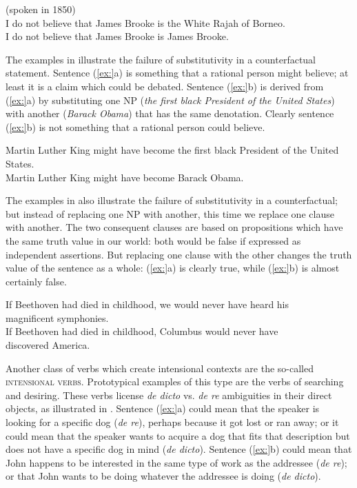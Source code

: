 \ea
(spoken in 1850)\\
\ea I do not believe that James Brooke is the White Rajah of Borneo.\\
\ex I do not believe that James Brooke is James Brooke.
                       \z
\z


The examples in  illustrate the failure of substitutivity in a counterfactual statement. Sentence (\ref{ex:}a) is something that a rational person might believe; at least it is a claim which could be debated. Sentence (\ref{ex:}b) is derived from (\ref{ex:}a) by substituting one NP (\textit{the first black President of the United States}) with another (\textit{Barack Obama}) that has the same denotation. Clearly sentence (\ref{ex:}b) is not something that a rational person could believe.


\ea
\ea Martin Luther King might have become the first black President of the United States.\\
\ex Martin Luther King might have become Barack Obama.
                       \z
\z


The examples in  also illustrate the failure of substitutivity in a counterfactual; but instead of replacing one NP with another, this time we replace one clause with another. The two consequent clauses are based on propositions which have the same truth value in our world: both would be false if expressed as independent assertions. But replacing one clause with the other changes the truth value of the sentence as a whole: (\ref{ex:}a) is clearly true, while (\ref{ex:}b) is almost certainly false.


\ea
\ea If Beethoven had died in childhood, we would never have heard his\\
  magnificent symphonies.\\
\ex If Beethoven had died in childhood, Columbus would never have\\
  discovered America.
                       \z
\z


Another class of verbs which create intensional contexts are the so-called \textsc{intensional verbs}. Prototypical examples of this type are the verbs of searching and desiring. These verbs license \textit{de dicto} vs. \textit{de re} ambiguities in their direct objects, as illustrated in . Sentence (\ref{ex:}a) could mean that the speaker is looking for a specific dog (\textit{de re}), perhaps because it got lost or ran away; or it could mean that the speaker wants to acquire a dog that fits that description but does not have a specific dog in mind (\textit{de dicto}). Sentence (\ref{ex:}b) could mean that John happens to be interested in the same type of work as the addressee (\textit{de re}); or that John wants to be doing whatever the addressee is doing (\textit{de dicto}).



